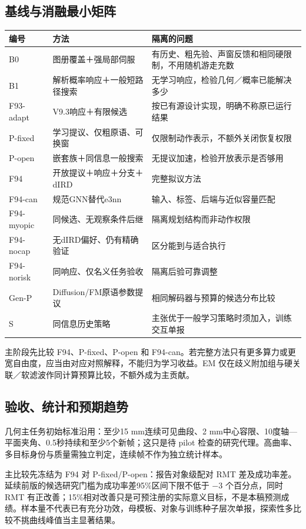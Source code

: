 \documentclass[UTF8,fontset=fandol,11pt,a4paper]{ctexart}
\theoremstyle{plain}
\theoremstyle{definition}
\theoremstyle{remark}
\numberwithin{equation}{section}
\begin{document}
\subsection{基线与消融最小矩阵}
\begin{longtable}{P{20mm}P{49mm}P{77mm}}
\toprule 编号 & 方法 & 隔离的问题\\\midrule\endhead
B0 & 图册覆盖＋强局部伺服 & 有历史、粗先验、声窗反馈和相同硬限制，不用随机游走充数\\
B1 & 解析概率响应＋一般短路径搜索 & 无学习响应，检验几何／概率已能解决多少\\
F93-adapt & V9.3响应＋有限候选 & 按已有源设计实现，明确不称原已运行结果\\
P-fixed & 学习提议、仅粗原语、可换窗 & 仅限制动作表示，不额外关闭恢复权限\\
P-open & 嵌套族＋同信息一般搜索 & 无提议加速，检验开放表示是否够用\\
F94 & 开放提议＋响应＋分支＋dIRD & 完整拟议方法\\
F94-can & 规范GNN替代e3nn & 输入、标签、后端与近似容量匹配\\
F94-myopic & 同候选、无观察条件后继 & 隔离规划结构而非动作权限\\
F94-nocap & 无dIRD偏好、仍有精确验证 & 区分能到与适合执行\\
F94-norisk & 同响应、仅名义任务验收 & 隔离后验可靠调整\\
Gen-P & Diffusion/FM原语参数提议 & 相同解码器与预算的候选分布比较\\
S & 同信息历史策略 & 主张优于一般学习策略时须加入，训练交互单报\\\bottomrule
\end{longtable}

主阶段先比较 F94、P-fixed、P-open 和 F94-can。若完整方法只有更多算力或更宽自由度，应当由对应对照解释，不能归为学习收益。EM 仅在歧义附加组与硬关联／软滤波作同计算预算比较，不额外成为主贡献。

\subsection{验收、统计和预期趋势}
几何主任务初始标准沿用：至少15 mm连续可见曲段、2 mm中心容限、10度轴—平面夹角、0.5秒持续和至少5个新帧；这只是待 pilot 检查的研究代理。高曲率、多目标身份与质量需独立判定，连续帧不作为独立统计样本。

主比较先冻结为 F94 对 P-fixed/P-open：报告对象级配对 RMT 差及成功率差。延续前版的候选研究门槛为成功率差95\%区间下限不低于 $-3$ 个百分点，同时 RMT 有正改善；15\%相对改善只是可预注册的实际意义目标，不是本稿预测成绩。样本量不代表已有充分功效，母模板、对象与训练种子层次单报，探索性多比较不挑曲线峰值当主显著结果。
\end{document}
